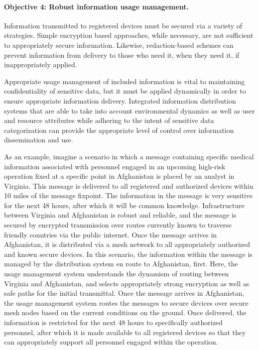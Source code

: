 \documentclass{sbir}
\begin{document}
\paragraph{Objective 4: Robust information usage management.} Information transmitted to registered devices must be secured via a variety of strategies. Simple encryption based approaches, while necessary, are not sufficient to appropriately secure information. Likewise, redaction-based schemes can prevent information from delivery to those who need it, when they need it, if inappropriately applied.

Appropriate usage management of included information is vital to maintaining confidentiality of sensitive data, but it must be applied dynamically in order to ensure appropriate information delivery. Integrated information distribution systems that are able to take into account environmental dynamics as well as user and resource attributes while adhering to the intent of sensitive data categorization can provide the appropriate level of control over information dissemination and use.

As an example, imagine a scenario in which a message containing specific medical information associated with personnel engaged in an upcoming high-risk operation fixed at a specific point in Afghanistan is placed by an analyst in Virginia. This message is delivered to all registered and authorized devices within 10 miles of the message fixpoint. The information in the message is very sensitive for the next 48 hours, after which it will be common knowledge. Infrastructure between Virginia and Afghanistan is robust and reliable, and the message is secured by encrypted transmission over routes currently known to traverse friendly countries via the public internet. Once the message arrives in Afghanistan, it is distributed via a mesh network to all appropriately authorized and known secure devices. In this scenario, the information within the message is managed by the distribution system en route to Afghanistan, first. Here, the usage management system understands the dynamism of routing between Virginia and Afghanistan, and selects appropriately strong encryption as well as safe paths for the initial transmittal. Once the message arrives in Afghanistan, the usage management system routes the messages to secure devices over secure mesh nodes based on the current conditions on the ground. Once delivered, the information is restricted for the next 48 hours to specifically authorized personnel, after which it is made available to all registered devices so that they can appropriately support all personnel engaged within the operation.
\end{document}
